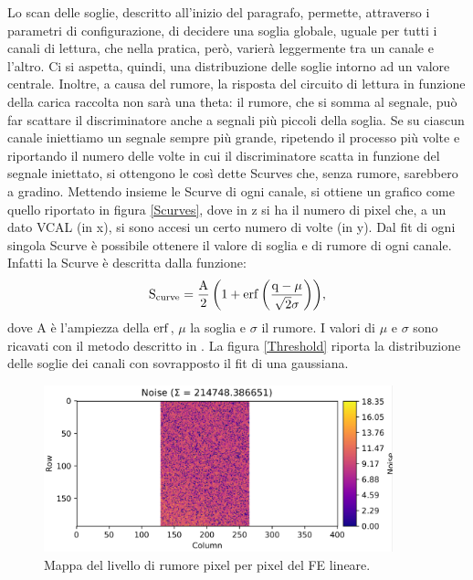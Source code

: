 Lo scan delle soglie, descritto all'inizio del paragrafo, permette, attraverso i parametri di configurazione, di decidere una soglia globale, uguale per tutti i canali di lettura, che nella pratica, però, varierà leggermente tra un canale e l'altro. 
Ci si aspetta, quindi, una distribuzione delle soglie intorno ad un valore centrale.
Inoltre, a causa del rumore, la risposta del circuito di lettura in funzione della carica raccolta non sarà una theta: il rumore, che si somma al segnale, può far scattare il discriminatore anche a segnali più piccoli della soglia.
Se su ciascun canale iniettiamo un segnale sempre più grande, ripetendo il processo più volte e riportando il numero delle volte in cui il discriminatore scatta in funzione del segnale iniettato, si ottengono le così dette Scurves che, senza rumore, sarebbero a gradino. 
Mettendo insieme le Scurve di ogni canale, si ottiene un grafico come quello riportato in figura \ref{Scurves}, dove in z si ha il numero di pixel che, a un dato VCAL (in x), si sono accesi un certo numero di volte (in y).
Dal fit di ogni singola Scurve è possibile ottenere il valore di soglia e di rumore di ogni canale.
Infatti la Scurve è descritta dalla funzione:
\begin{equation}
  \mathrm{S_{curve} = \frac{A}{2} \left( 1 + \operatorname{erf} \left( \frac{q-\mu}{\sqrt{2}\sigma} \right) \right)},
\end{equation}
dove A è l'ampiezza della $\operatorname{erf}$, $\mu$ la soglia e $\sigma$ il rumore.
I valori di $\mu$ e $\sigma$ sono ricavati con il metodo descritto in \cite{ERF}.
La figura \ref{Threshold} riporta la distribuzione delle soglie dei canali con sovrapposto il fit di una gaussiana.
\begin{figure}
\centering
\includegraphics[width=0.9\textwidth]{Immagini/NoiseMap}
\caption{Mappa del livello di rumore pixel per pixel del FE lineare.}
\label{NoiseMap}
\end{figure}

